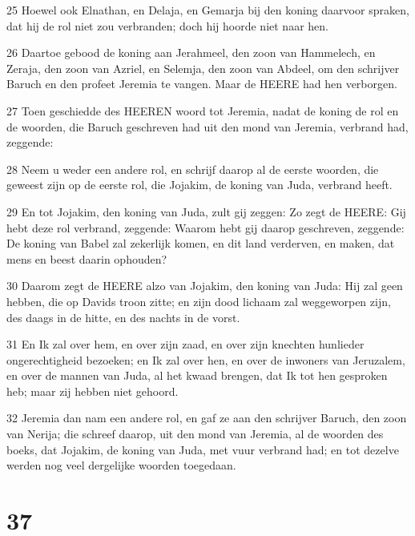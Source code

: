 \par 25 Hoewel ook Elnathan, en Delaja, en Gemarja bij den koning daarvoor spraken, dat hij de rol niet zou verbranden; doch hij hoorde niet naar hen.
\par 26 Daartoe gebood de koning aan Jerahmeel, den zoon van Hammelech, en Zeraja, den zoon van Azriel, en Selemja, den zoon van Abdeel, om den schrijver Baruch en den profeet Jeremia te vangen. Maar de HEERE had hen verborgen.
\par 27 Toen geschiedde des HEEREN woord tot Jeremia, nadat de koning de rol en de woorden, die Baruch geschreven had uit den mond van Jeremia, verbrand had, zeggende:
\par 28 Neem u weder een andere rol, en schrijf daarop al de eerste woorden, die geweest zijn op de eerste rol, die Jojakim, de koning van Juda, verbrand heeft.
\par 29 En tot Jojakim, den koning van Juda, zult gij zeggen: Zo zegt de HEERE: Gij hebt deze rol verbrand, zeggende: Waarom hebt gij daarop geschreven, zeggende: De koning van Babel zal zekerlijk komen, en dit land verderven, en maken, dat mens en beest daarin ophouden?
\par 30 Daarom zegt de HEERE alzo van Jojakim, den koning van Juda: Hij zal geen hebben, die op Davids troon zitte; en zijn dood lichaam zal weggeworpen zijn, des daags in de hitte, en des nachts in de vorst.
\par 31 En Ik zal over hem, en over zijn zaad, en over zijn knechten hunlieder ongerechtigheid bezoeken; en Ik zal over hen, en over de inwoners van Jeruzalem, en over de mannen van Juda, al het kwaad brengen, dat Ik tot hen gesproken heb; maar zij hebben niet gehoord.
\par 32 Jeremia dan nam een andere rol, en gaf ze aan den schrijver Baruch, den zoon van Nerija; die schreef daarop, uit den mond van Jeremia, al de woorden des boeks, dat Jojakim, de koning van Juda, met vuur verbrand had; en tot dezelve werden nog veel dergelijke woorden toegedaan.

\chapter{37}

